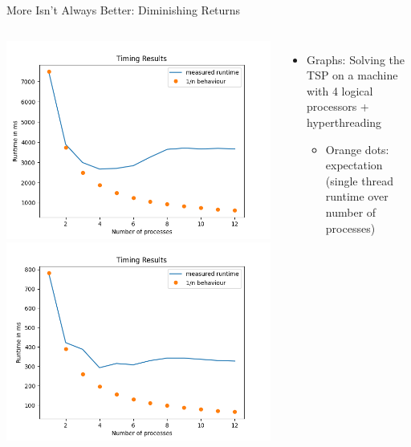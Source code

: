 
\begin{frame}{More Isn't Always Better: Diminishing Returns}
%
\begin{columns}
\includegraphics[width=\linewidth]{./gfx/09-cpu-count-1}
\includegraphics[width=\linewidth]{./gfx/09-cpu-count-2}
%
\begin{itemize}
\item Graphs: Solving the TSP on a machine with 4 logical processors + hyperthreading
	\begin{itemize}
	\item Orange dots: expectation (single thread runtime over number of processes)

\end{itemize}
\end{itemize}
\end{columns}
\end{frame}
